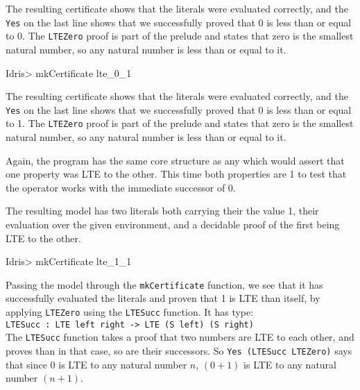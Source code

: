         \newpage
        
        
        The resulting certificate shows that the literals were evaluated correctly, and the \texttt{Yes} on the last line shows that we successfully proved that 0 is less than or equal to 0. The \texttt{LTEZero} proof is part of the \Idris prelude and states that zero is the smallest natural number, so any natural number is less than or equal to it.
        
        \begin{code}
Idris> mkCertificate lte_0_1
        \end{code}
        
        The resulting certificate shows that the literals were evaluated correctly, and the \texttt{Yes} on the last line shows that we successfully proved that 0 is less than or equal to 1. The \texttt{LTEZero} proof is part of the \Idris prelude and states that zero is the smallest natural number, so any natural number is less than or equal to it.
        
        \newpage
        
        
        
        Again, the program has the same core structure as any which would assert that one property was LTE to the other. This time both properties are 1 to test that the operator works with the immediate successor of 0.
        
        
        The resulting \Idris model has two literals both carrying their the value 1, their evaluation over the given environment, and a decidable proof of the first being LTE to the other.
        
        \begin{code}
Idris> mkCertificate lte_1_1
        \end{code}
        
        Passing the model through the \texttt{mkCertificate} function, we see that it has successfully evaluated the literals and proven that 1 is LTE than itself, by applying \texttt{LTEZero} using the \texttt{LTESucc} function. It has type:\\
        \texttt{LTESucc : LTE left right -> LTE (S left) (S right)}\\
        The \texttt{LTESucc} function takes a proof that two numbers are LTE to each other, and proves than in that case, so are their successors. So \texttt{Yes (LTESucc LTEZero)} says that since 0 is LTE to any natural number $n$, $(0 + 1)$ is LTE to any natural number $(n + 1)$.
        
